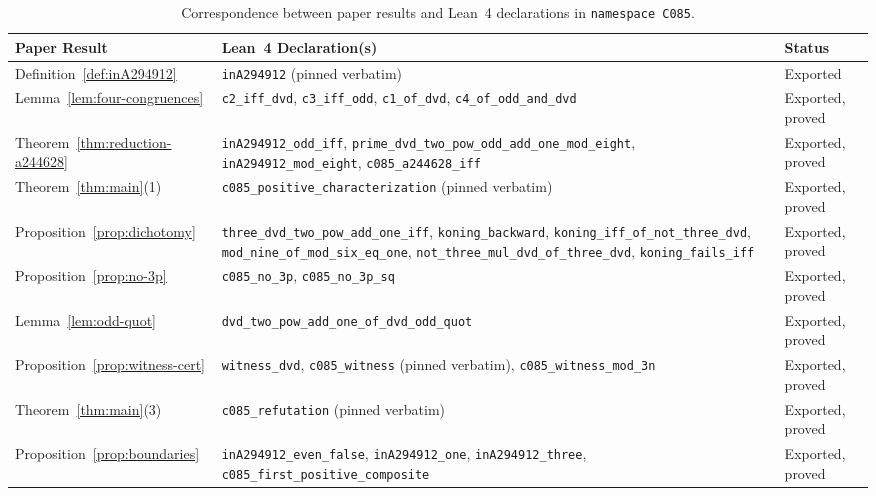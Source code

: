 \documentclass[11pt]{article}
\theoremstyle{definition}
\begin{document}
\begin{table}[ht]
\centering
\caption{Correspondence between paper results and Lean~4 declarations in \nolinkurl{namespace C085}.}
\label{tab:lean-map}
\smallskip
{\small
\begin{tabular}{@{}l >{\raggedright\arraybackslash}p{8.4cm} l@{}}
\toprule
Paper Result & Lean~4 Declaration(s) & Status \\
\midrule
Definition~\ref{def:inA294912} & \texttt{inA294912} (pinned verbatim) & Exported \\
Lemma~\ref{lem:four-congruences} & \texttt{c2\_iff\_dvd}, \texttt{c3\_iff\_odd}, \texttt{c1\_of\_dvd}, \texttt{c4\_of\_odd\_and\_dvd} & Exported, proved \\
Theorem~\ref{thm:reduction-a244628} & \texttt{inA294912\_odd\_iff}, \texttt{prime\_dvd\_two\_pow\_odd\_add\_one\_mod\_eight}, \texttt{inA294912\_mod\_eight}, \texttt{c085\_a244628\_iff} & Exported, proved \\
Theorem~\ref{thm:main}(1) & \texttt{c085\_positive\_characterization} (pinned verbatim) & Exported, proved \\
Proposition~\ref{prop:dichotomy} & \texttt{three\_dvd\_two\_pow\_add\_one\_iff}, \texttt{koning\_backward}, \texttt{koning\_iff\_of\_not\_three\_dvd}, \texttt{mod\_nine\_of\_mod\_six\_eq\_one}, \texttt{not\_three\_mul\_dvd\_of\_three\_dvd}, \texttt{koning\_fails\_iff} & Exported, proved \\
Proposition~\ref{prop:no-3p} & \texttt{c085\_no\_3p}, \texttt{c085\_no\_3p\_sq} & Exported, proved \\
Lemma~\ref{lem:odd-quot} & \texttt{dvd\_two\_pow\_add\_one\_of\_dvd\_odd\_quot} & Exported, proved \\
Proposition~\ref{prop:witness-cert} & \texttt{witness\_dvd}, \texttt{c085\_witness} (pinned verbatim), \texttt{c085\_witness\_mod\_3n} & Exported, proved \\
Theorem~\ref{thm:main}(3) & \texttt{c085\_refutation} (pinned verbatim) & Exported, proved \\
Proposition~\ref{prop:boundaries} & \texttt{inA294912\_even\_false}, \texttt{inA294912\_one}, \texttt{inA294912\_three}, \texttt{c085\_first\_positive\_composite} & Exported, proved \\
\bottomrule
\end{tabular}
}
\end{table}
\end{document}
